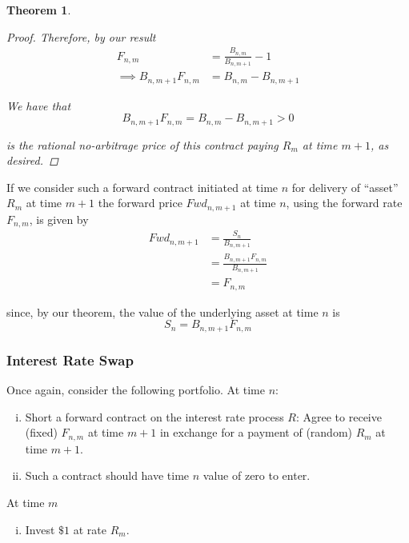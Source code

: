 \documentclass[12pt]{article}
\newtheorem{theorem}{Theorem}
\begin{document}
\begin{theorem}
\begin{proof}
Therefore, by our result
\begin{align*}
	F_{n,m} &= \frac{ B_{n,m} }{ B_{n, m + 1} } - 1 \\
	\implies B_{n,m + 1}F_{n,m} &= B_{n,m} - B_{n, m + 1}
\end{align*}

We have that
\begin{equation*}
	B_{n,m + 1}F_{n,m} = B_{n,m} - B_{n, m + 1} > 0
\end{equation*}

is the rational no-arbitrage price of this contract paying $R_m$ at time $m + 1$, as desired.
\end{proof}
\end{theorem}

If we consider such a forward contract initiated at time $n$ for delivery of ``asset'' $R_m$ at time $m + 1$ the forward price $Fwd_{n,m + 1}$ at time $n$, using the forward rate $F_{n,m}$, is given by
\begin{align*}
	Fwd_{n,m + 1} &= \frac{ S_n }{ B_{n, m + 1} } \\
	&= \frac{ B_{n, m + 1}F_{n, m} }{ B_{n, m + 1} } \\
	&= F_{n,m}
\end{align*}

since, by our theorem, the value of the underlying asset at time $n$ is
\begin{equation*}
	S_n = B_{n,m + 1}F_{n,m}
\end{equation*}

\subsubsection{Interest Rate Swap}

Once again, consider the following portfolio. At time $n$:
\begin{enumerate}[(i)]
	\item Short a forward contract on the interest rate process $R$: Agree to receive (fixed) $F_{n,m}$ at time $m + 1$ in exchange for a payment of (random) $R_m$ at time $m + 1$.
	\item Such a contract should have time $n$ value of zero to enter.
\end{enumerate}

At time $m$
\begin{enumerate}[(i)]
	\item Invest $\$1$ at rate $R_m$.
\end{enumerate}
\end{document}

